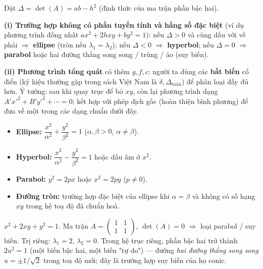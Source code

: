 \documentclass[12pt,a4paper]{article}
\begin{document}
\begin{congthuc}[title={Bất biến và phân loại (trường hợp không suy biến mạnh)}]
Đặt $\Delta = \det(A) = ab - h^2$ (định thức của ma trận phần bậc hai).

\medskip
\textbf{(i) Trường hợp không có phần tuyến tính và hằng số đặc biệt} (ví dụ phương trình đồng nhất $ax^2 + 2hxy + by^2 = 1$): nếu $\Delta > 0$ và cùng dấu với vế phải $\Rightarrow$ \textbf{ellipse} (tròn nếu $\lambda_1 = \lambda_2$); nếu $\Delta < 0$ $\Rightarrow$ \textbf{hyperbol}; nếu $\Delta = 0$ $\Rightarrow$ \textbf{parabol} hoặc hai đường thẳng song song / trùng / ảo (suy biến).

\medskip
\textbf{(ii) Phương trình tổng quát} có thêm $g, f, c$: người ta dùng các \textbf{bất biến} cổ điển (ký hiệu thường gặp trong sách Việt Nam là $\delta, \Delta_{\text{toàn}}$) để phân loại đầy đủ hơn. Ý tưởng: sau khi quay trục để bỏ $xy$, còn lại phương trình dạng $A' x'^2 + B' y'^2 + \cdots = 0$; kết hợp với phép dịch gốc (hoàn thiện bình phương) để đưa về một trong các dạng chuẩn dưới đây.
\end{congthuc}

\begin{tinhchat}[title={Các dạng chuẩn (sau khi đã quay và dịch trục)}]
\begin{itemize}
  \item \textbf{Ellipse:} $\dfrac{x^2}{\alpha^2} + \dfrac{y^2}{\beta^2} = 1$ \quad ($\alpha, \beta > 0$, $\alpha \ne \beta$).
  \item \textbf{Hyperbol:} $\dfrac{x^2}{\alpha^2} - \dfrac{y^2}{\beta^2} = 1$ hoặc dấu âm ở $x^2$.
  \item \textbf{Parabol:} $y^2 = 2px$ hoặc $x^2 = 2py$ \quad ($p \ne 0$).
  \item \textbf{Đường tròn:} trường hợp đặc biệt của ellipse khi $\alpha = \beta$ và không có số hạng $xy$ trong hệ toạ độ đã chuẩn hoá.
\end{itemize}
\end{tinhchat}

\begin{vidu}[title={Nhận dạng conic qua trị riêng}]
$x^2 + 2xy + y^2 = 1$. Ma trận $A = \begin{pmatrix}1 & 1\\ 1 & 1\end{pmatrix}$, $\det(A) = 0$ $\Rightarrow$ loại parabol / suy biến. Trị riêng: $\lambda_1 = 2$, $\lambda_2 = 0$. Trong hệ trục riêng, phần bậc hai trở thành $2 u^2 = 1$ (một biến bậc hai, một biến "tự do") --- đường \emph{hai đường thẳng song song} $u = \pm 1/\sqrt{2}$ trong toạ độ mới; đây là trường hợp suy biến của họ conic.
\end{vidu}
\end{document}
